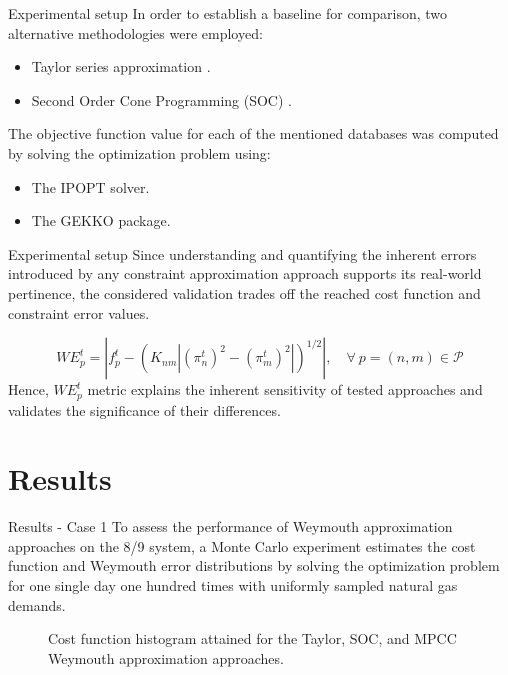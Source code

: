 \documentclass[hyperref={colorlinks,citecolor=blue,linkcolor=blue,urlcolor=blue}]{beamer}
\newlength\figureheight
\newlength\figurewidth
\begin{document}
\begin{frame}{Experimental setup}
In order to establish a baseline for comparison, two alternative methodologies were employed: 
\begin{itemize}
    \item Taylor series approximation \cite{taylor_paper}.
    \item Second Order Cone Programming (SOC) \cite{soc_paper}.
\end{itemize}

The objective function value for each of the mentioned databases was computed by solving the optimization problem using: 
\begin{itemize}
    \item The IPOPT \cite{ipopt} solver.
    \item The GEKKO \cite{gekko} package. 
\end{itemize}

\end{frame}

\begin{frame}{Experimental setup}
    Since understanding and quantifying the inherent errors introduced by any constraint approximation approach supports its real-world pertinence, the considered validation trades off the reached cost function and constraint error values.

    \begin{equation}
    {WE}_p^t = |f_{p}^t - \left(K_{nm}|(\pi_{n}^t)^2-(\pi_{m}^t)^2|\right)^{1/2}| , \quad \forall \ p =(n,m) \in\mathcal{P}
\end{equation}
Hence, ${WE}_p^t$ metric explains the inherent sensitivity of tested approaches and validates the significance of their differences.
\end{frame}



\section{Results}
\begin{frame}{Results - Case 1}
To assess the performance of Weymouth approximation approaches on the 8/9 system, a Monte Carlo experiment estimates the cost function and Weymouth error distributions by solving  the optimization problem for one single day one hundred times with uniformly sampled natural gas demands. 

    \begin{figure}[!htb]
    \centering
    \setlength{}        
    \setlength{}
    
    \caption{Cost function histogram attained for the Taylor, SOC, and MPCC Weymouth approximation approaches.}
    \label{fig:blue_test_cost}
\end{figure}
\end{frame}
\end{document}
